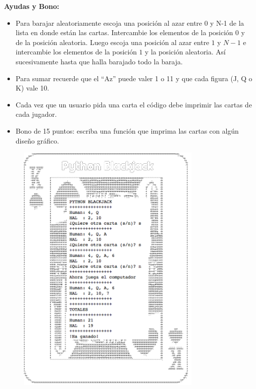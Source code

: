 \documentclass[11pt,letterpaper]{exam}
\begin{document}
\begin{questions}
\begin{parts}
\end{parts}
\vspace{1cm}
{\bf Ayudas y Bono:} 

\begin{itemize}

\item Para barajar aleatoriamente escoja una posición al azar entre 0 y N-1 de la lista en donde están las cartas.
      Intercambie los elementos de la posición $0$ y de la posición aleatoria.  Luego escoja una posición al azar
      entre $1$ y $N-1$ e intercambie los elementos de la posición $1$ y la posición aleatoria. Así sucesivamente hasta que halla barajado todo la baraja.
\item Para sumar recuerde que el ``Az'' puede valer 1 o 11 y que cada figura (J, Q o K) vale 10.
\item Cada vez que un usuario pida una carta el código debe imprimir las cartas de cada jugador. 
\item Bono de 15 puntos: escriba una función que imprima las cartas con algún diseño gráfico.

\end{itemize}

\end{questions}


\begin{figure}[h!]
\begin{center}
	\includegraphics[width=0.8\textwidth]{./pyblackj.pdf}
\end{center}
\end{figure}
\newpage
\newpage
\end{document}
